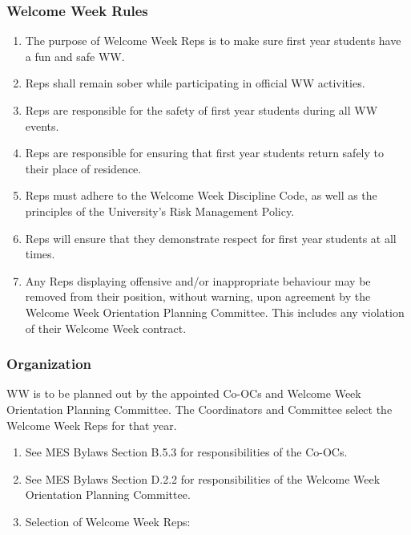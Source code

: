\begin{enumerate}
\begin{enumerate}
\begin{enumerate}
  \end{enumerate}
\end{enumerate}

\hypertarget{welcome-week-rules}{%
 \subsubsection{Welcome Week Rules}
 \label{welcome-week-rules}}
\begin{enumerate}
 \item
  The purpose of Welcome Week Reps is to make sure first year students
  have a fun and safe WW.
 \item
  Reps shall remain sober while participating in official WW activities.
 \item
  Reps are responsible for the safety of first year students during all
  WW events.
 \item
  Reps are responsible for ensuring that first year students return
  safely to their place of residence.
 \item
  Reps must adhere to the Welcome Week Discipline Code, as well as the
  principles of the University's Risk Management Policy.
 \item
  Reps will ensure that they demonstrate respect for first year students
  at all times.
 \item
  Any Reps displaying offensive and/or inappropriate behaviour may be
  removed from their position, without warning, upon agreement by the
  Welcome Week Orientation Planning Committee. This includes any
  violation of their Welcome Week contract.
\end{enumerate}

\hypertarget{organization}{%
 \subsubsection{Organization}
 \label{organization}}
WW is to be planned out by the appointed Co-OCs and Welcome Week
Orientation Planning Committee. The Coordinators and Committee select
the Welcome Week Reps for that year.

\begin{enumerate}
 \item
  See MES Bylaws Section B.5.3 for responsibilities of the Co-OCs.
 \item
  See MES Bylaws Section D.2.2 for responsibilities of the Welcome Week
  Orientation Planning Committee.
 \item
  Selection of Welcome Week Reps:


\end{enumerate}
\end{enumerate}

